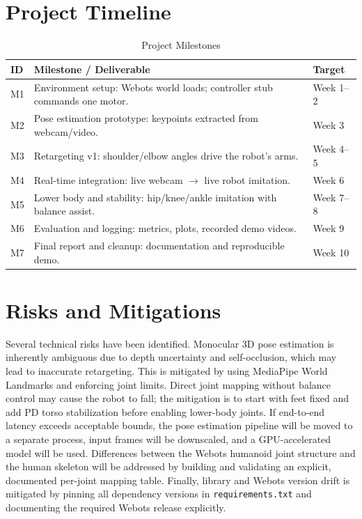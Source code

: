 \documentclass[conference]{IEEEtran}
\begin{document}
\section{Project Timeline}
 
\begin{table}[H]
  \centering
  \caption{Project Milestones}
  \begin{tabularx}{\columnwidth}{lXl}
    \toprule
    \textbf{ID} & \textbf{Milestone / Deliverable} & \textbf{Target} \\
    \midrule
    M1 & Environment setup: Webots world loads; controller stub commands one motor. & Week 1--2 \\
    M2 & Pose estimation prototype: keypoints extracted from webcam/video. & Week 3 \\
    M3 & Retargeting v1: shoulder/elbow angles drive the robot's arms. & Week 4--5 \\
    M4 & Real-time integration: live webcam $\rightarrow$ live robot imitation. & Week 6 \\
    M5 & Lower body and stability: hip/knee/ankle imitation with balance assist. & Week 7--8 \\
    M6 & Evaluation and logging: metrics, plots, recorded demo videos. & Week 9 \\
    M7 & Final report and cleanup: documentation and reproducible demo. & Week 10 \\
    \bottomrule
  \end{tabularx}
\end{table}
 
\section{Risks and Mitigations}
Several technical risks have been identified. Monocular 3D pose estimation is inherently
ambiguous due to depth uncertainty and self-occlusion, which may lead to inaccurate
retargeting. This is mitigated by using MediaPipe World Landmarks and enforcing joint limits.
Direct joint mapping without balance control may cause the robot to fall; the mitigation is
to start with feet fixed and add PD torso stabilization before enabling lower-body joints.
If end-to-end latency exceeds acceptable bounds, the pose estimation pipeline will be moved
to a separate process, input frames will be downscaled, and a GPU-accelerated model will be
used. Differences between the Webots humanoid joint structure and the human skeleton will be
addressed by building and validating an explicit, documented per-joint mapping table. Finally,
library and Webots version drift is mitigated by pinning all dependency versions in
\texttt{requirements.txt} and documenting the required Webots release explicitly.
 
\end{document}
